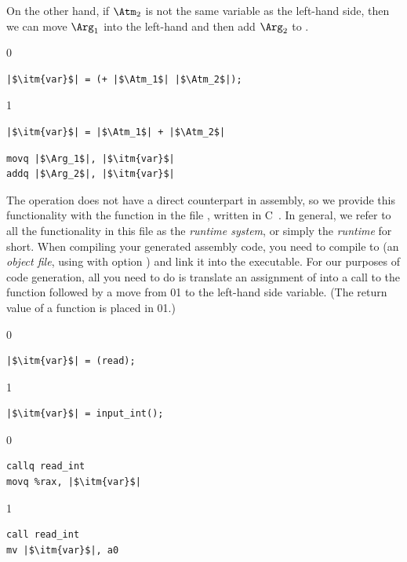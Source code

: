 \documentclass[7x10]{TimesAPriori_MIT}%
\def\racketEd{0}
\def\pythonEd{1}
\def\edition{1}
\def\xeightysixEd{0}
\def\riscvEd{1}
\def\architecture{1}
\newcommand\ifriscv[1]{\if\architecture\riscvEd{#1}\fi}
\newcommand\ifxeightsix[1]{\if\architecture\xeightysixEd{#1}\fi}
\newcommand{\pythonColor}[0]{}
\numberwithin{theorem}{chapter}
\numberwithin{definition}{chapter}
\numberwithin{equation}{chapter}
\begin{document}
%
On the other hand, if $\Atm_2$ is not the same variable as the
left-hand side, then we can move $\Arg_1$ into the left-hand 
and then add $\Arg_2$ to .
%
\begin{transformation}
{\if\edition\racketEd    
\begin{lstlisting}
|$\itm{var}$| = (+ |$\Atm_1$| |$\Atm_2$|);
\end{lstlisting}
\fi}
{\if\edition\pythonEd\pythonColor
\begin{lstlisting}
|$\itm{var}$| = |$\Atm_1$| + |$\Atm_2$|
\end{lstlisting}
\fi}
\compilesto
\begin{lstlisting}
movq |$\Arg_1$|, |$\itm{var}$|
addq |$\Arg_2$|, |$\itm{var}$|
\end{lstlisting}
\end{transformation}
\fi

The \READOP{} operation does not have a direct counterpart in {\ArchName}
assembly, so we provide this functionality with the function
 in the file , written in
C~\citep{Kernighan:1988nx}. In general, we refer to all the
functionality in this file as the \emph{runtime system}, or simply the \emph{runtime} for short. When compiling your
generated {\ArchName} assembly code, you need to compile  to
 (an \emph{object file}, using  with option
) and link it into the executable. For our purposes of code
generation, all you need to do is translate an assignment of
\READOP{} into a call to the  function followed by a
move from \ifxeightsix{}\ifriscv{} to the left-hand side variable.  (The
return value of a function is placed in \ifxeightsix{}\ifriscv{}.)  
\begin{transformation}
{\if\edition\racketEd  
\begin{lstlisting}
|$\itm{var}$| = (read);
\end{lstlisting}
\fi}
{\if\edition\pythonEd\pythonColor
\begin{lstlisting}
|$\itm{var}$| = input_int();
\end{lstlisting}
\fi}
\compilesto
\if\architecture\xeightysixEd
\begin{lstlisting}
callq read_int
movq %rax, |$\itm{var}$|
\end{lstlisting}
\fi
\if\architecture\riscvEd
\begin{lstlisting}
call read_int
mv |$\itm{var}$|, a0
\end{lstlisting}
\fi
\end{transformation}
\end{document}
